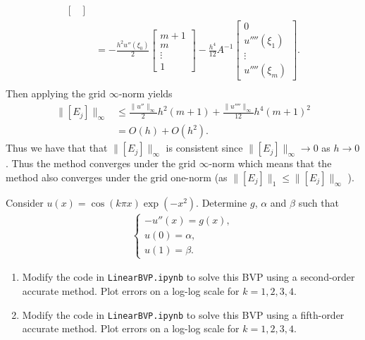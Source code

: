 \documentclass[12pt]{report}
\begin{document}
\begin{solution}
\begin{enumerate}
\begin{align*}
\begin{bmatrix}
      \end{bmatrix}\\
      &= - \frac{h^2 u''(\xi_0)}{2}\begin{bmatrix}
        m+1\\ m \\ \vdots \\ 1
      \end{bmatrix} - \frac{h^4}{12}A^{-1}\begin{bmatrix}
        0\\ u''''(\xi_1) \\ \vdots\\  u''''(\xi_m)
      \end{bmatrix}.\\
    \end{align*}
    Then applying the grid $\infty$-norm yields
    \begin{align*}
      \|[E_j]\|_\infty &\leq \frac{\|u''\|_\infty}{2} h^2 (m+1) + \frac{\|u''''\|_\infty}{12} h^4(m+1)^2\\
      &= O(h) + O(h^2).
    \end{align*}
    Thus we have that that $\|[E_j]\|_\infty$ is consistent since $\|[E_j]\|_\infty \rightarrow 0$ as $h\rightarrow 0$. Thus the method converges under the grid $\infty$-norm which means that the method also converges under the grid one-norm (as $\| [E_j] \|_1 \leq \| [E_j] \|_\infty$ ). 

  \end{enumerate}
\end{solution}

\newpage



\begin{problem}
    Consider $u(x) = \cos(k \pi x) \exp(-x^2)$.  Determine $g$, $\alpha$ and $\beta$ such that
  \begin{align*}
    \begin{cases} -u''(x) = g(x),\\
      u(0) = \alpha,\\
      u(1) = \beta. \end{cases}
  \end{align*}
  \begin{enumerate}
  \item Modify the code in {\tt LinearBVP.ipynb} to solve this BVP using a second-order accurate method.  Plot errors on a log-log scale for $k = 1,2,3,4$.
   \item Modify the code in {\tt LinearBVP.ipynb} to solve this BVP using a fifth-order accurate method.  Plot errors on a log-log scale for $k = 1,2,3,4$. 
  \end{enumerate}
\end{problem}
\end{document}
